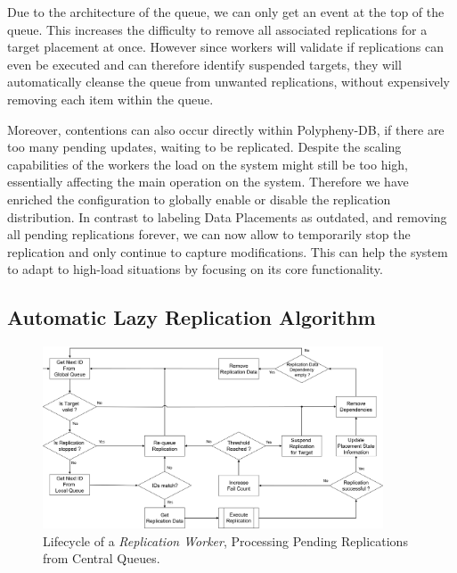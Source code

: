 Due to the architecture of the queue, we can only get an event at the top of the queue. This increases the difficulty to remove all associated replications 
for a target placement at once. However since workers will validate if replications can even be executed and can therefore identify suspended targets, they will
automatically cleanse the queue from unwanted replications, without expensively removing each item within the queue.

Moreover, contentions can also occur directly within Polypheny-DB, if there are too many pending updates, waiting to be replicated.
Despite the scaling capabilities of the workers the load on the system might still be too high, essentially affecting the main operation on the system.
Therefore we have enriched the configuration to globally enable or disable the replication distribution. In contrast to labeling Data Placements as outdated, 
and removing all pending replications forever, we can now allow to temporarily stop the replication and only continue to capture modifications. This can help the system
to adapt to high-load situations by focusing on its core functionality.\\



\subsection{Automatic Lazy Replication Algorithm}
\label{sec:algo}

\begin{figure}[t] 
    \centering
    \includegraphics[width=0.9\textwidth]{Figures/flow_worker.png}
    \caption{Lifecycle of a \textit{Replication Worker}, Processing Pending Replications from Central Queues.}
    \label{fig:flow_worker}
\end{figure}

